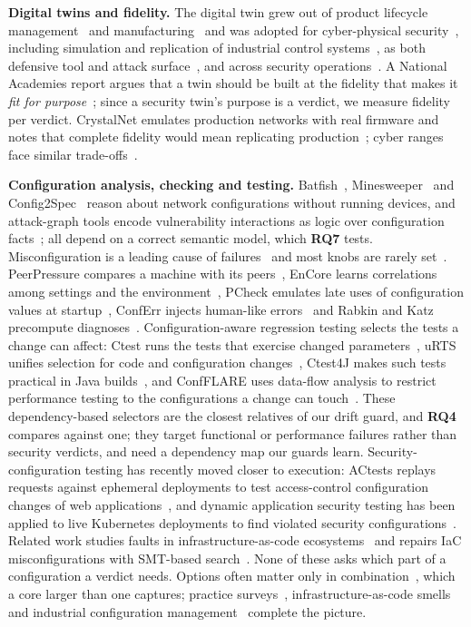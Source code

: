 \documentclass[conference]{IEEEtran}
\newcommand{\RQ}[1]{\textbf{RQ#1}}
\begin{document}
\textbf{Digital twins and fidelity.} The digital twin grew out of product lifecycle management~\cite{grieves2017} and manufacturing~\cite{tao2019} and was adopted for cyber-physical security~\cite{eckhart2018,eckhart2019}, including simulation and replication of industrial control systems~\cite{dietz2020}, as both defensive tool and attack surface~\cite{holmes2021}, and across security operations~\cite{empl2025}. A National Academies report argues that a twin should be built at the fidelity that makes it \emph{fit for purpose}~\cite{nasem2024}; since a security twin's purpose is a verdict, we measure fidelity per verdict. CrystalNet emulates production networks with real firmware and notes that complete fidelity would mean replicating production~\cite{crystalnet2017}; cyber ranges face similar trade-offs~\cite{yamin2020}.

\textbf{Configuration analysis, checking and testing.} Batfish~\cite{batfish2015}, Minesweeper~\cite{minesweeper2017} and Config2Spec~\cite{config2spec2020} reason about network configurations without running devices, and attack-graph tools encode vulnerability interactions as logic over configuration facts~\cite{ou2005,sheyner2002}; all depend on a correct semantic model, which \RQ{7} tests. Misconfiguration is a leading cause of failures~\cite{yin2011} and most knobs are rarely set~\cite{xu2015}. PeerPressure compares a machine with its peers~\cite{peerpressure2004}, EnCore learns correlations among settings and the environment~\cite{encore2014}, PCheck emulates late uses of configuration values at startup~\cite{pcheck2016}, ConfErr injects human-like errors~\cite{conferr2008} and Rabkin and Katz precompute diagnoses~\cite{rabkin2011}. Configuration-aware regression testing selects the tests a change can affect: Ctest runs the tests that exercise changed parameters~\cite{ctest2020}, uRTS unifies selection for code and configuration changes~\cite{urts2023}, Ctest4J makes such tests practical in Java builds~\cite{ctest4j2024}, and ConfFLARE uses data-flow analysis to restrict performance testing to the configurations a change can touch~\cite{confflare2025}. These dependency-based selectors are the closest relatives of our drift guard, and \RQ{4} compares against one; they target functional or performance failures rather than security verdicts, and need a dependency map our guards learn. Security-configuration testing has recently moved closer to execution: ACtests replays requests against ephemeral deployments to test access-control configuration changes of web applications~\cite{actests2025}, and dynamic application security testing has been applied to live Kubernetes deployments to find violated security configurations~\cite{shamim2025}. Related work studies faults in infrastructure-as-code ecosystems~\cite{drosos2024} and repairs IaC misconfigurations with SMT-based search~\cite{infrafix2025}. None of these asks which part of a configuration a verdict needs. Options often matter only in combination~\cite{siegmund2012}, which a core larger than one captures; practice surveys~\cite{sayagh2020}, infrastructure-as-code smells~\cite{rahman2019} and industrial configuration management~\cite{tang2015} complete the picture.
\end{document}
